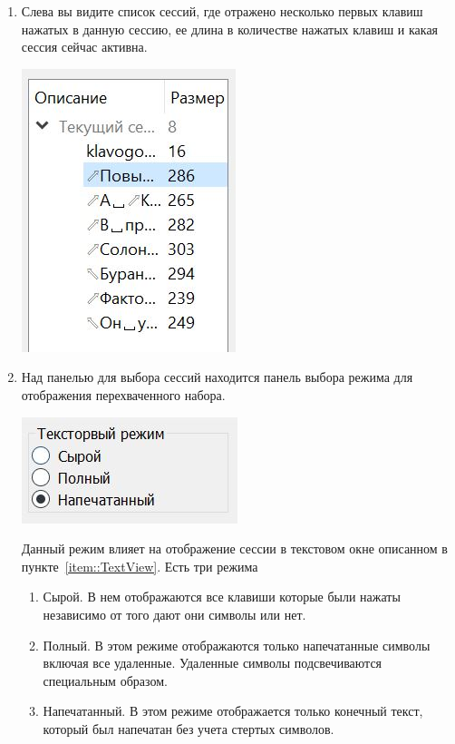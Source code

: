 \begin{enumerate}
\item
Слева вы видите список сессий, где отражено несколько первых клавиш нажатых в данную сессию, ее длина в количестве нажатых клавиш и какая сессия сейчас активна.
\begin{center}
\includegraphics[scale=0.5]{Figures/SessView.JPG}
\end{center}

\item Над панелью для выбора сессий находится панель выбора режима для отображения перехваченного набора.
\begin{center}
\includegraphics[scale=0.5]{Figures/textmodev.JPG}
\end{center}
Данный режим влияет на отображение сессии в текстовом окне описанном в пункте~\ref{item::TextView}.
Есть три режима
\begin{enumerate}
\item Сырой.
В нем отображаются все клавиши которые были нажаты независимо от того дают они символы или нет.

\item Полный.
В этом режиме отображаются только напечатанные символы включая все удаленные.
Удаленные символы подсвечиваются специальным образом.

\item Напечатанный.
В этом режиме отображается только конечный текст, который был напечатан без учета стертых символов.
\end{enumerate}


\end{enumerate}
